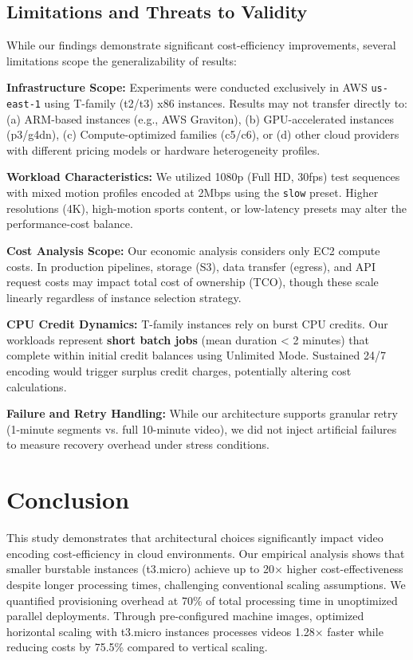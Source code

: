 \documentclass[conference]{IEEEtran}
\newcommand{\revnote}[1]{\todo[inline, color=green!40, size=\footnotesize]{#1}}
\begin{document}
\begin{shaded}
\section{Limitations and Threats to Validity}
\label{sec:limitations}
\revnote{New Section: Limitations (Address R2/R3 scope concerns).}

While our findings demonstrate significant cost-efficiency improvements, several limitations scope the generalizability of results:

\textbf{Infrastructure Scope:} Experiments were conducted exclusively in AWS \texttt{us-east-1} using T-family (t2/t3) x86 instances. Results may not transfer directly to: (a) ARM-based instances (e.g., AWS Graviton), (b) GPU-accelerated instances (p3/g4dn), (c) Compute-optimized families (c5/c6), or (d) other cloud providers with different pricing models or hardware heterogeneity profiles.

\textbf{Workload Characteristics:} We utilized 1080p (Full HD, 30fps) test sequences with mixed motion profiles encoded at 2Mbps using the \texttt{slow} preset. Higher resolutions (4K), high-motion sports content, or low-latency presets may alter the performance-cost balance.

\textbf{Cost Analysis Scope:} Our economic analysis considers only EC2 compute costs. In production pipelines, storage (S3), data transfer (egress), and API request costs may impact total cost of ownership (TCO), though these scale linearly regardless of instance selection strategy.

\textbf{CPU Credit Dynamics:} T-family instances rely on burst CPU credits. Our workloads represent \textbf{short batch jobs} (mean duration < 2 minutes) that complete within initial credit balances using Unlimited Mode. Sustained 24/7 encoding would trigger surplus credit charges, potentially altering cost calculations.

\textbf{Failure and Retry Handling:} While our architecture supports granular retry (1-minute segments vs. full 10-minute video), we did not inject artificial failures to measure recovery overhead under stress conditions.
\end{shaded}

\section{Conclusion}
\label{conclusion}

This study demonstrates that architectural choices significantly impact video encoding cost-efficiency in cloud environments. Our empirical analysis shows that smaller burstable instances (t3.micro) achieve up to 20× higher cost-effectiveness despite longer processing times, challenging conventional scaling assumptions. We quantified provisioning overhead at 70\% of total processing time in unoptimized parallel deployments. Through pre-configured machine images, optimized horizontal scaling with t3.micro instances processes videos 1.28× faster while reducing costs by 75.5\% compared to vertical scaling.
\end{document}

